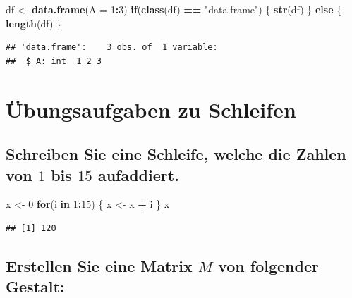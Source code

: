 \documentclass[12pt,a4paper]{article}
\newenvironment{Shaded}{\begin{snugshade}}{\end{snugshade}}
\newcommand{\AttributeTok}[1]{\textcolor[rgb]{0.13,0.29,0.53}{#1}}
\newcommand{\ControlFlowTok}[1]{\textcolor[rgb]{0.13,0.29,0.53}{\textbf{#1}}}
\newcommand{\DecValTok}[1]{\textcolor[rgb]{0.00,0.00,0.81}{#1}}
\newcommand{\FunctionTok}[1]{\textcolor[rgb]{0.13,0.29,0.53}{\textbf{#1}}}
\newcommand{\NormalTok}[1]{#1}
\newcommand{\OtherTok}[1]{\textcolor[rgb]{0.56,0.35,0.01}{#1}}
\newcommand{\SpecialCharTok}[1]{\textcolor[rgb]{0.81,0.36,0.00}{\textbf{#1}}}
\newcommand{\StringTok}[1]{\textcolor[rgb]{0.31,0.60,0.02}{#1}}
\begin{document}
\begin{Shaded}
\begin{Highlighting}[]
\NormalTok{    df }\OtherTok{\textless{}{-}} \FunctionTok{data.frame}\NormalTok{(}\AttributeTok{A =} \DecValTok{1}\SpecialCharTok{:}\DecValTok{3}\NormalTok{)}
    \ControlFlowTok{if}\NormalTok{(}\FunctionTok{class}\NormalTok{(df) }\SpecialCharTok{==} \StringTok{"data.frame"}\NormalTok{) \{}
      \FunctionTok{str}\NormalTok{(df)}
\NormalTok{    \} }\ControlFlowTok{else}\NormalTok{ \{}
      \FunctionTok{length}\NormalTok{(df)}
\NormalTok{    \}}
\end{Highlighting}
\end{Shaded}

\begin{verbatim}
## 'data.frame':    3 obs. of  1 variable:
##  $ A: int  1 2 3
\end{verbatim}

\hypertarget{uxfcbungsaufgaben-zu-schleifen}{%
\section{Übungsaufgaben zu
Schleifen}\label{uxfcbungsaufgaben-zu-schleifen}}

\hypertarget{schreiben-sie-eine-schleife-welche-die-zahlen-von-1-bis-15-aufaddiert.}{%
\subsection{\texorpdfstring{Schreiben Sie eine Schleife, welche die
Zahlen von \(1\) bis \(15\)
aufaddiert.}{Schreiben Sie eine Schleife, welche die Zahlen von 1 bis 15 aufaddiert.}}\label{schreiben-sie-eine-schleife-welche-die-zahlen-von-1-bis-15-aufaddiert.}}

\begin{Shaded}
\begin{Highlighting}[]
\NormalTok{    x }\OtherTok{\textless{}{-}} \DecValTok{0}
    \ControlFlowTok{for}\NormalTok{(i }\ControlFlowTok{in} \DecValTok{1}\SpecialCharTok{:}\DecValTok{15}\NormalTok{) \{}
\NormalTok{      x }\OtherTok{\textless{}{-}}\NormalTok{ x }\SpecialCharTok{+}\NormalTok{ i}
\NormalTok{    \}}
\NormalTok{    x}
\end{Highlighting}
\end{Shaded}

\begin{verbatim}
## [1] 120
\end{verbatim}

\hypertarget{erstellen-sie-eine-matrix-m-von-folgender-gestalt}{%
\subsection{\texorpdfstring{Erstellen Sie eine Matrix \(M\) von
folgender
Gestalt:}{Erstellen Sie eine Matrix M von folgender Gestalt:}}\label{erstellen-sie-eine-matrix-m-von-folgender-gestalt}}
\end{document}
